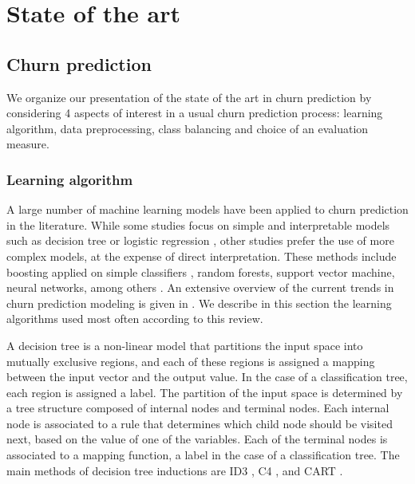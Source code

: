 \chapter{State of the art}
\label{ch:sota}

\section{Churn prediction}

We organize our presentation of the state of the art in churn prediction by
considering 4 aspects of interest in a usual churn prediction process: learning
algorithm, data preprocessing, class balancing and choice of an evaluation
measure.

\subsection{Learning algorithm}

A large number of machine learning models have been applied to churn prediction
in the literature. While some studies focus on simple and interpretable models
such as decision tree \parencite{keramati2014improved} or logistic regression
\parencite{olle2014hybrid}, other studies prefer the use of more complex models,
at the expense of direct interpretation. These methods include boosting applied
on simple classifiers \parencite{vafeiadis2015comparison}, random forests,
support vector machine, neural networks, among others
\parencite{umayaparvathi2016attribute, verbeke2012new}. An extensive overview of
the current trends in churn prediction modeling is given in
\parencite{kayaalp2017review}. We describe in this section the learning
algorithms used most often according to this review.

A decision tree is a non-linear model that partitions the input space into
mutually exclusive regions, and each of these regions is assigned a mapping
between the input vector and the output value. In the case of a classification
tree, each region is assigned a label. The partition of the input space is
determined by a tree structure composed of internal nodes and terminal nodes.
Each internal node is associated to a rule that determines which child node
should be visited next, based on the value of one of the variables. Each of the
terminal nodes is associated to a mapping function,  a label in the case of a
classification tree. The main methods of decision tree inductions are ID3
\parencite{quinlan1986induction}, C4 \parencite{quinlan1987simplifying}, and
CART \parencite{breiman1984classification}.

